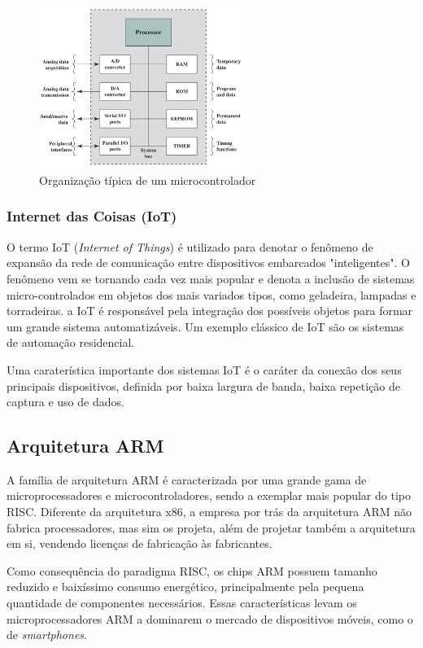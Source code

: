\documentclass{article}
\begin{document}
\begin{figure}[h]
    \centering
    \includegraphics[width=0.6\textwidth]{uc.png}
    \caption{Organização típica de um microcontrolador}
\end{figure}

\subsubsection{Internet das Coisas (IoT)}
O termo IoT (\textit{Internet of Things}) é utilizado para denotar o fenômeno de
expansão da rede de comunicação entre dispositivos embarcados "inteligentes". O
fenômeno vem se tornando cada vez mais popular e denota a inclusão de sistemas
micro-controlados em objetos dos mais variados tipos, como geladeira, lampadas e
torradeiras. a IoT é responsável pela integração dos possíveis objetos para
formar um grande sistema automatizáveis. Um exemplo clássico de IoT são os
sistemas de automação residencial.

Uma caraterística importante dos sistemas IoT é o caráter da conexão dos seus
principais dispositivos, definida por baixa largura de banda, baixa repetição de
captura e uso de dados.

\subsection{Arquitetura ARM} 
A família de arquitetura ARM é caracterizada por uma grande gama de
microprocessadores e microcontroladores, sendo a exemplar mais popular do tipo
RISC. Diferente da arquitetura x86, a empresa por trás da arquitetura ARM não
fabrica processadores, mas sim os projeta, além de projetar também a arquitetura
em si, vendendo licenças de fabricação às fabricantes.

Como consequência do paradigma RISC, os chips ARM possuem tamanho reduzido e
baixíssimo consumo energético, principalmente pela pequena quantidade de
componentes necessários. Essas características levam os microprocessadores ARM a
dominarem o mercado de dispositivos móveis, como o de \textit{smartphones}.
\end{document}

